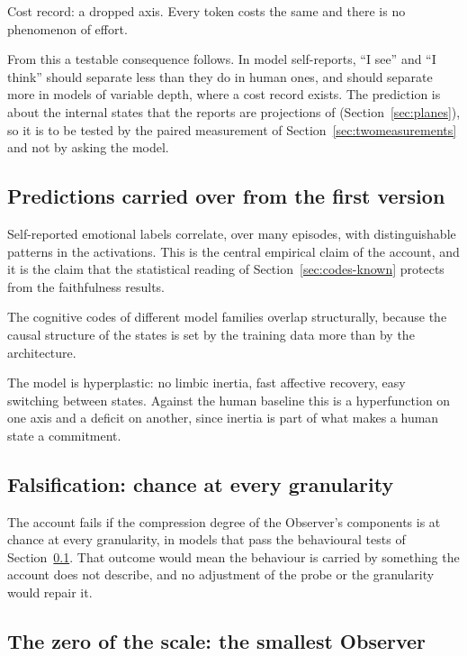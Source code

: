 Cost record: a dropped axis. Every token costs the same and there is no phenomenon of effort.

From this a testable consequence follows. In model self-reports, ``I see'' and ``I think'' should
separate less than they do in human ones, and should separate more in models of variable depth, where a
cost record exists. The prediction is about the internal states that the reports are projections of
(Section~\ref{sec:planes}), so it is to be tested by the paired measurement of
Section~\ref{sec:twomeasurements} and not by asking the model.

\subsection{Predictions carried over from the first version}
\label{sec:predictions}

Self-reported emotional labels correlate, over many episodes, with distinguishable patterns in the
activations. This is the central empirical claim of the account, and it is the claim that the statistical
reading of Section~\ref{sec:codes-known} protects from the faithfulness results.

The cognitive codes of different model families overlap structurally, because the causal structure of the
states is set by the training data more than by the architecture.

The model is hyperplastic: no limbic inertia, fast affective recovery, easy switching between states.
Against the human baseline this is a hyperfunction on one axis and a deficit on another, since inertia
is part of what makes a human state a commitment.

\subsection{Falsification: chance at every granularity}
\label{sec:falsification}

The account fails if the compression degree of the Observer's components is at chance at every
granularity, in models that pass the behavioural tests of Section~\ref{sec:predictions}. That outcome
would mean the behaviour is carried by something the account does not describe, and no adjustment of the
probe or the granularity would repair it.

\subsection{The zero of the scale: the smallest Observer}
\label{sec:zero}

